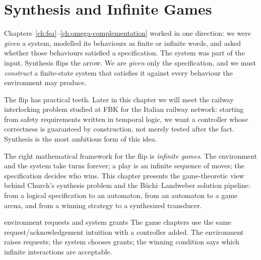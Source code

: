 
\chapter{Synthesis and Infinite Games}
\label{ch:synthesis-games}


Chapters~\ref{ch:fsa}--\ref{ch:omega-complementation} worked in
one direction: we were \emph{given} a system, modelled its behaviours as
finite or infinite words, and asked whether those behaviours satisfied a
specification.  The system was part of the input.  Synthesis flips the
arrow.  We are \emph{given} only the specification, and we must
\emph{construct} a finite-state system that satisfies it against every
behaviour the environment may produce.

The flip has practical teeth.  Later in this chapter we will meet the
railway interlocking problem studied at FBK for the Italian railway
network: starting from safety requirements written in temporal logic, we
want a controller whose correctness is guaranteed by construction, not
merely tested after the fact.  Synthesis is the most ambitious form of
this idea.

The right mathematical framework for the flip is \emph{infinite games}.
The environment and the system take turns forever; a play is an infinite
sequence of moves; the specification decides who wins.  This chapter
presents the game-theoretic view behind Church's synthesis problem and
the B\"uchi--Landweber solution pipeline: from a logical specification
to an automaton, from an automaton to a game arena, and from a winning
strategy to a synthesized transducer.


\begin{runningexample}{environment requests and system grants}
The game chapters use the same request/acknowledgement intuition with a
controller added.  The environment raises requests; the system chooses grants;
the winning condition says which infinite interactions are acceptable.
\end{runningexample}


